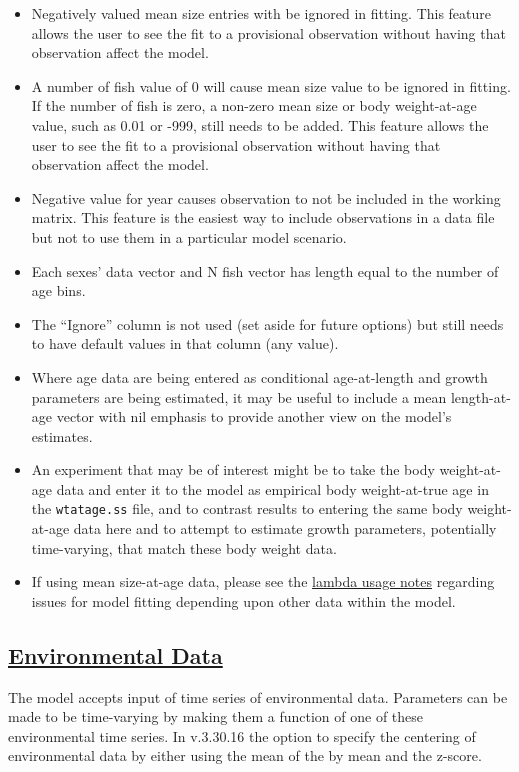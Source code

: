\begin{itemize}
	\item Negatively valued mean size entries with be ignored in fitting. This feature allows the user to see the fit to a provisional observation without having that observation affect the model.
	\item A number of fish value of 0 will cause mean size value to be ignored in fitting. If the number of fish is zero, a non-zero mean size or body weight-at-age value, such as 0.01 or -999, still needs to be added. This feature allows the user to see the fit to a provisional observation without having that observation affect the model.
	\item Negative value for year causes observation to not be included in the working matrix. This feature is the easiest way to include observations in a data file but not to use them in a particular model scenario.
	\item Each sexes' data vector and N fish vector has length equal to the number of age bins.
	\item The ``Ignore'' column is not used (set aside for future options) but still needs to have default values in that column (any value). 
	\item Where age data are being entered as conditional age-at-length and growth parameters are being estimated, it may be useful to include a mean length-at-age vector with nil emphasis to provide another view on the model's estimates.
	\item An experiment that may be of interest might be to take the body weight-at-age data and enter it to the model as empirical body weight-at-true age in the \texttt{wtatage.ss} file, and to contrast results to entering the same body weight-at-age data here and to attempt to estimate growth parameters, potentially time-varying, that match these body weight data.
	\item If using mean size-at-age data, please see the \hyperlink{SaAlambda}{lambda usage notes} regarding issues for model fitting depending upon other data within the model.  		
\end{itemize}

\hypertarget{env-dat}{}
\subsection[Environmental Data]{\protect\hyperlink{env-dat}{Environmental Data}}
The model accepts input of time series of environmental data. Parameters can be made to be time-varying by making them a function of one of these environmental time series. In v.3.30.16 the option to specify the centering of environmental data by either using the mean of the by mean and the z-score. 

